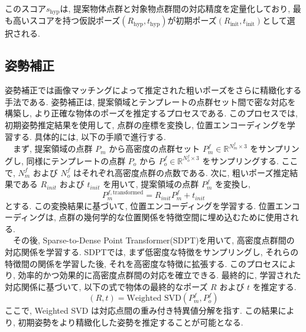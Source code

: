 このスコア$s_{\text{hyp}}$は, 提案物体点群と対象物点群間の対応精度を定量化しており, 最も高いスコアを持つ仮説ポーズ$(R_{\text{hyp}}, t_{\text{hyp}})$が初期ポーズ$(R_{\text{init}}, t_{\text{init}})$として選択される. 

\subsection{姿勢補正}
姿勢補正では画像マッチングによって推定された粗いポーズをさらに精緻化する手法である. 
姿勢補正は, 提案領域とテンプレートの点群セット間で密な対応を構築し, より正確な物体のポーズを推定するプロセスである. 
このプロセスでは, 初期姿勢推定結果を使用して, 点群の座標を変換し, 位置エンコーディングを学習する. 具体的には, 以下の手順で進行する. \\
　まず, 提案領域の点群 $P_m$ から高密度の点群セット $P_m^f \in \mathbb{R}^{N_m^f \times 3}$ をサンプリングし, 同様にテンプレートの点群 $P_o$ から $P_o^f \in \mathbb{R}^{N_o^f \times 3}$ をサンプリングする. 
ここで, $N_m^f$ および $N_o^f$ はそれぞれ高密度点群の点数である. 
次に, 粗いポーズ推定結果である $R_{init}$ および $t_{init}$ を用いて, 提案領域の点群 $P_m^f$ を変換し, 
\[
P_m^{f, \text{transformed}} = R_{init} P_m^f + t_{init}
\]
とする. この変換結果に基づいて, 位置エンコーディングを学習する. 位置エンコーディングは, 点群の幾何学的な位置関係を特徴空間に埋め込むために使用される. \\
　その後, Sparse-to-Dense Point Transformer(SDPT)を用いて, 高密度点群間の対応関係を学習する. 
SDPTでは, まず低密度な特徴をサンプリングし, それらの特徴間の関係を学習した後, それを高密度な特徴に拡張する. 
このプロセスにより, 効率的かつ効果的に高密度点群間の対応を確立できる. 
最終的に, 学習された対応関係に基づいて, 以下の式で物体の最終的なポーズ $R$ および $t$ を推定する.
\[
(R, t) = \text{Weighted SVD}(P_m^f, P_o^f)
\]
ここで, Weighted SVD は対応点間の重み付き特異値分解を指す. 
この結果により, 初期姿勢をより精緻化した姿勢を推定することが可能となる. 

